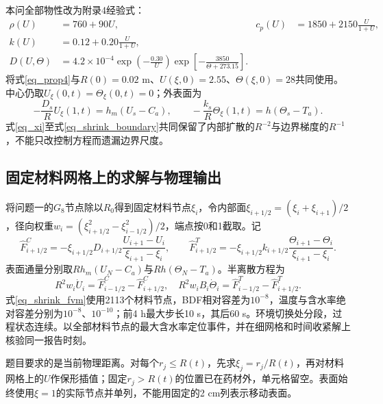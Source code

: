 本问全部物性改为附录4经验式：
\begin{equation}\label{eq_prop4}
\begin{aligned}
\rho(U)&=760+90U,&c_p(U)&=1850+2150\frac{U}{1+U},\\
k(U)&=0.12+0.20\frac{U}{1+U},&&\\[-3pt]
D(U,\Theta)&=4.2\times10^{-4}\exp\!\left(-\frac{0.30}{U}\right)
\exp\!\left[-\frac{3850}{\Theta+273.15}\right].&&
\end{aligned}
\end{equation}
将式\eqref{eq_prop4}与$R(0)=0.02$ m、$U(\xi,0)=2.55$、$\Theta(\xi,0)=28$共同使用。中心仍取$U_\xi(0,t)=\Theta_\xi(0,t)=0$；外表面为
\begin{equation}\label{eq_shrink_boundary}
-\frac{D_s}{R}U_\xi(1,t)=h_m(U_s-C_a),\qquad
-\frac{k_s}{R}\Theta_\xi(1,t)=h(\Theta_s-T_a).
\end{equation}
式\eqref{eq_xi}至式\eqref{eq_shrink_boundary}共同保留了内部扩散的$R^{-2}$与边界梯度的$R^{-1}$，不能只改控制方程而遗漏边界尺度。

\subsection{固定材料网格上的求解与物理输出}
将问题一的$G_8$节点除以$R_0$得到固定材料节点$\xi_i$，令内部面$\xi_{i+1/2}=(\xi_i+\xi_{i+1})/2$，径向权重$w_i=(\xi_{i+1/2}^2-\xi_{i-1/2}^2)/2$，端点按0和1截取。记
\[
\widehat F^C_{i+1/2}=-\xi_{i+1/2}D_{i+1/2}
\frac{U_{i+1}-U_i}{\xi_{i+1}-\xi_i},\qquad
\widehat F^T_{i+1/2}=-\xi_{i+1/2}k_{i+1/2}
\frac{\Theta_{i+1}-\Theta_i}{\xi_{i+1}-\xi_i}.
\]
表面通量分别取$Rh_m(U_N-C_a)$与$Rh(\Theta_N-T_a)$。半离散方程为
\begin{equation}\label{eq_shrink_fvm}
R^2w_i\dot U_i=\widehat F^C_{i-1/2}-\widehat F^C_{i+1/2},\quad
R^2w_iB_i\dot\Theta_i=\widehat F^T_{i-1/2}-\widehat F^T_{i+1/2}.
\end{equation}
式\eqref{eq_shrink_fvm}使用2113个材料节点，BDF相对容差为$10^{-8}$，温度与含水率绝对容差分别为$10^{-8}$、$10^{-10}$；前4 h最大步长10 s，其后60 s。环境切换处分段，过程状态连续。以全部材料节点的最大含水率定位事件，并在细网格和时间收紧解上核验同一报告时刻。

题目要求的是当前物理距离。对每个$r_j\le R(t)$，先求$\xi_j=r_j/R(t)$，再对材料网格上的$U$作保形插值；固定$r_j>R(t)$的位置已在药材外，单元格留空。表面始终使用$\xi=1$的实际节点并单列，不能用固定的2 cm列表示移动表面。

